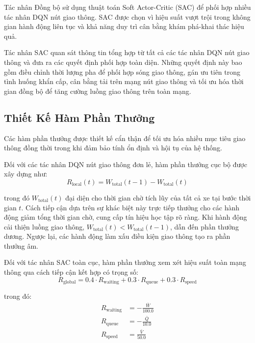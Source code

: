 Tác nhân Đồng bộ sử dụng thuật toán Soft Actor-Critic (SAC) để phối hợp nhiều tác nhân DQN nút giao thông. 
SAC được chọn vì hiệu suất vượt trội trong không gian hành động liên tục và khả năng duy trì cân bằng 
khám phá-khai thác hiệu quả.

Tác nhân SAC quan sát thông tin tổng hợp từ tất cả các tác nhân DQN nút giao thông và đưa ra các quyết định 
phối hợp toàn diện. Những quyết định này bao gồm điều chỉnh thời lượng pha để phối hợp sóng giao thông, 
gán ưu tiên trong tình huống khẩn cấp, cân bằng tải trên mạng nút giao thông và tối ưu hóa thời gian 
đồng bộ để tăng cường luồng giao thông trên toàn mạng.

\subsection{Thiết Kế Hàm Phần Thưởng}\label{subsec2a-4}

Các hàm phần thưởng được thiết kế cẩn thận để tối ưu hóa nhiều mục tiêu giao thông đồng thời 
trong khi đảm bảo tính ổn định và hội tụ của hệ thống.

Đối với các tác nhân DQN nút giao thông đơn lẻ, hàm phần thưởng cục bộ được xây dựng như:
\begin{equation}
    R_{\text{local}}(t) = W_{\text{total}}(t-1) - W_{\text{total}}(t)
\end{equation}

trong đó $W_{\text{total}}(t)$ đại diện cho thời gian chờ tích lũy của tất cả xe tại bước thời gian $t$. 
Cách tiếp cận dựa trên sự khác biệt này trực tiếp thưởng cho các hành động giảm tổng thời gian chờ, 
cung cấp tín hiệu học tập rõ ràng. Khi hành động cải thiện luồng giao thông, 
$W_{\text{total}}(t) < W_{\text{total}}(t-1)$, dẫn đến phần thưởng dương. Ngược lại, 
các hành động làm xấu điều kiện giao thông tạo ra phần thưởng âm.

Đối với tác nhân SAC toàn cục, hàm phần thưởng xem xét hiệu suất toàn mạng thông qua cách tiếp cận 
kết hợp có trọng số:
\begin{equation}
    R_{\text{global}} = 0.4 \cdot R_{\text{waiting}} + 0.3 \cdot R_{\text{queue}} + 0.3 \cdot R_{\text{speed}}
\end{equation}

trong đó:
\begin{align}
    R_{\text{waiting}} &= -\frac{\bar{W}}{100.0} \\
    R_{\text{queue}} &= -\frac{\bar{Q}}{10.0} \\
    R_{\text{speed}} &= \frac{\bar{V}}{50.0}
\end{align}

